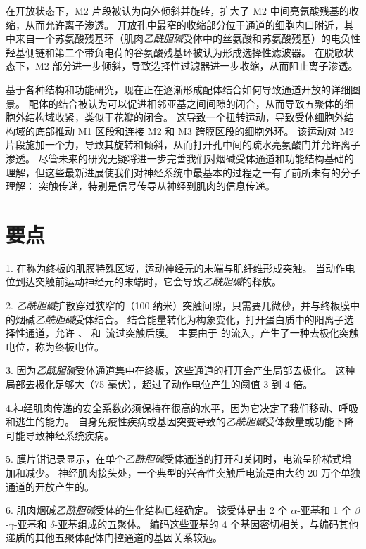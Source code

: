 在开放状态下，M2 片段被认为向外倾斜并旋转，扩大了 M2 中间亮氨酸残基的收缩，从而允许离子渗透。
开放孔中最窄的收缩部分位于通道的细胞内口附近，其中来自一个苏氨酸残基环（肌肉\textit{乙酰胆碱}受体中的丝氨酸和苏氨酸残基）的电负性羟基侧链和第二个带负电荷的谷氨酸残基环被认为形成选择性滤波器。
在脱敏状态下，M2 部分进一步倾斜，导致选择性过滤器进一步收缩，从而阻止离子渗透。


基于各种结构和功能研究，现在正在逐渐形成配体结合如何导致通道开放的详细图景。
配体的结合被认为可以促进相邻亚基之间间隙的闭合，从而导致五聚体的细胞外结构域收紧，类似于花瓣的闭合。
这导致一个扭转运动，导致受体细胞外结构域的底部推动 M1 区段和连接 M2 和 M3 跨膜区段的细胞外环。
该运动对 M2 片段施加一个力，导致其旋转和倾斜，从而打开孔中间的疏水亮氨酸门并允许离子渗透。
尽管未来的研究无疑将进一步完善我们对烟碱受体通道和功能结构基础的理解，但这些最新进展使我们对神经系统中最基本的过程之一有了前所未有的分子理解：
突触传递，特别是信号传导从神经到肌肉的信息传递。



\section{要点}

1. 在称为终板的肌膜特殊区域，运动神经元的末端与肌纤维形成突触。
当动作电位到达突触前运动神经元的末端时，它会导致\textit{乙酰胆碱}的释放。


2. \textit{乙酰胆碱}扩散穿过狭窄的（100 纳米）突触间隙，只需要几微秒，并与终板膜中的烟碱\textit{乙酰胆碱}受体结合。
结合能量转化为构象变化，打开蛋白质中的阳离子选择性通道，允许 、 和~流过突触后膜。
主要由于  的流入，产生了一种去极化突触电位，称为终板电位。


3. 因为\textit{乙酰胆碱}受体通道集中在终板，这些通道的打开会产生局部去极化。
这种局部去极化足够大（75 毫伏），超过了动作电位产生的阈值 3 到 4 倍。


4.神经肌肉传递的安全系数必须保持在很高的水平，因为它决定了我们移动、呼吸和逃生的能力。
自身免疫性疾病或基因突变导致的\textit{乙酰胆碱}受体数量或功能下降可能导致神经系统疾病。 


5. 膜片钳记录显示，在单个\textit{乙酰胆碱}受体通道的打开和关闭时，电流呈阶梯式增加和减少。
神经肌肉接头处，一个典型的兴奋性突触后电流是由大约 20 万个单独通道的开放产生的。 


6. 肌肉烟碱\textit{乙酰胆碱}受体的生化结构已经确定。
该受体是由 2 个 $\alpha$-亚基和 1 个 $\beta$-$\gamma$-亚基和 $\delta$-亚基组成的五聚体。
编码这些亚基的 4 个基因密切相关，与编码其他递质的其他五聚体配体门控通道的基因关系较远。


